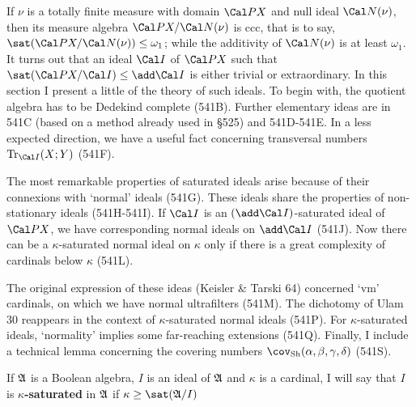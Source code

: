 
\def\chaptername{Real-valued-measurable cardinals}
\def\sectionname{Saturated ideals}

\def\covSh{\cov_{\text{Sh}}}
\def\Esic{$\exists$sic}
\def\Ewic{$\exists$wic}
\def\Tr{\mathop{\text{Tr}}}


If $\nu$ is a totally finite measure with domain $\Cal PX$ and null
ideal $\Cal N(\nu)$, then its measure algebra $\Cal PX/\Cal N(\nu)$ is
ccc, that is to say, $\sat(\Cal PX/\Cal N(\nu))\le\omega_1$;  while the
additivity of $\Cal N(\nu)$ is at least $\omega_1$.   It turns out that
an ideal $\Cal I$ of $\Cal PX$ such that
$\sat(\Cal PX/\Cal I)\le\add\Cal I$ is either trivial or extraordinary.
In this section I present a little of the theory of such ideals.   To
begin with, the quotient algebra has to be Dedekind complete (541B).
Further elementary ideas are in 541C (based on a method already used in
\S525) and 541D-541E.   In a less expected direction, we have a useful
fact concerning transversal numbers $\Tr_{\Cal I}(X;Y)$ (541F).

The most remarkable properties of saturated ideals arise because of
their connexions with `normal' ideals (541G).   These ideals share the
properties of non-stationary ideals (541H-541I).   If $\Cal I$ is an
$(\add\Cal I)$-saturated ideal of $\Cal PX$, we have corresponding
normal ideals on $\add\Cal I$ (541J).   Now there can be a
$\kappa$-saturated normal ideal on $\kappa$ only if there is a great
complexity of cardinals below $\kappa$ (541L).

The original expression of these ideas ({\smc Keisler \& Tarski 64})
concerned `\2vm' cardinals, on which we have normal ultrafilters (541M).
The dichotomy of {\smc Ulam 30} reappears in the
context of $\kappa$-saturated normal ideals (541P).   For
$\kappa$-saturated ideals, `normality' implies some far-reaching
extensions (541Q).   Finally, I include a technical lemma concerning the
covering numbers $\covSh(\alpha,\beta,\gamma,\delta)$ (541S).

 If $\frak A$ is a Boolean algebra, $I$ is an
ideal of $\frak A$ and $\kappa$ is a cardinal, I will say that $I$ is
{\bf $\kappa$-saturated} in $\frak A$ if
$\kappa\ge\sat(\frak A/I)$

